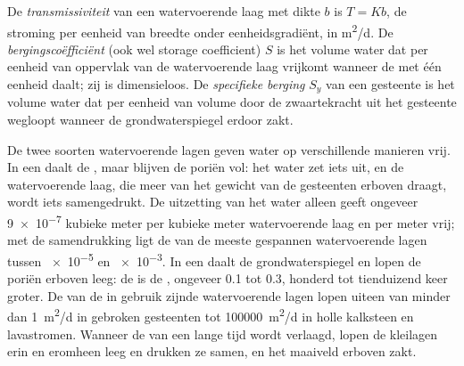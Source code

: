 \begin{definition}\label{def:b3:hydrogeology:storage}
De \emph{transmissiviteit} van een watervoerende laag met dikte
$b$ is $T = Kb$, de stroming per eenheid van breedte onder eenheidsgradiënt, in
\unit{m^2/d}. De \emph{bergingscoëfficiënt} (ook wel
storage coefficient) $S$ is het volume water dat per eenheid van oppervlak van de
watervoerende laag vrijkomt wanneer de  met één eenheid daalt; zij is dimensieloos. De
\emph{specifieke berging} $S_y$ van een gesteente is het
volume water dat per eenheid van volume door de zwaartekracht uit het gesteente
wegloopt wanneer de grondwaterspiegel erdoor zakt.
\end{definition}

De twee soorten watervoerende lagen geven water op verschillende manieren vrij. In een  daalt de , maar blijven de poriën vol: het water zet
iets uit, en de watervoerende laag, die meer van het gewicht van de gesteenten
erboven draagt, wordt iets samengedrukt. De uitzetting van het water alleen geeft
ongeveer \num{9e-7} kubieke meter per kubieke meter watervoerende laag en per meter
 vrij; met de samendrukking ligt de  van de meeste
gespannen watervoerende lagen tussen \num{e-5} en \num{e-3}. In een  daalt de grondwaterspiegel en lopen de poriën erboven leeg:
de  is de , ongeveer 0.1 tot 0.3, honderd
tot tienduizend keer groter. De  van de in gebruik zijnde watervoerende lagen
lopen uiteen van minder dan \qty{1}{m^2/d} in gebroken gesteenten tot
\qty{100000}{m^2/d} in holle kalksteen en lavastromen. Wanneer de  van een  lange tijd wordt verlaagd, lopen de kleilagen erin en eromheen leeg en drukken ze samen, en het maaiveld erboven zakt.

